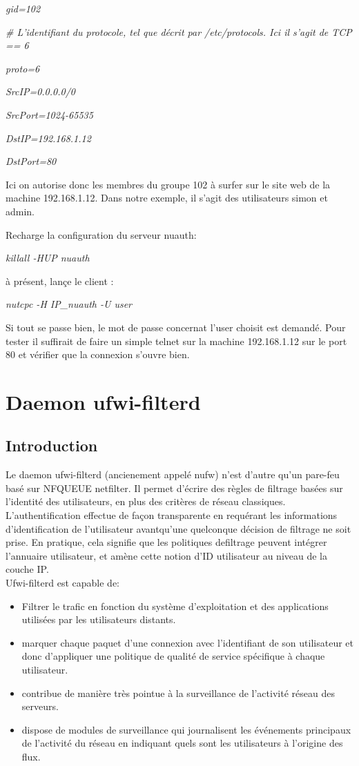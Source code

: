 \documentclass[12pt]{report}
\begin{document}
\begin{itemize}
\textit{gid=102}

\textit{# L’identifiant du protocole, tel que décrit par /etc/protocols. Ici il s’agit de TCP == 6}

\textit{proto=6}

\textit{SrcIP=0.0.0.0/0}

\textit{SrcPort=1024-65535}

\textit{DstIP=192.168.1.12}

\textit{DstPort=80}

Ici on autorise donc les membres du groupe 102 à surfer sur le site web de la machine 192.168.1.12. Dans notre exemple, 
il s’agit des utilisateurs simon et admin.

Recharge la configuration du serveur nuauth:

\textit{killall -HUP nuauth}

à présent, lançe le client :

\textit{nutcpc -H IP\_nuauth -U user}

Si tout se passe bien, le mot de passe concernat l'user choisit est demandé. Pour tester il suffirait de faire un simple
telnet sur la machine 192.168.1.12 sur le port 80 et vérifier que la connexion s'ouvre bien.


\chapter{Daemon ufwi-filterd}
\section{Introduction}

	Le daemon ufwi-filterd (ancienement appelé nufw) n'est d'autre qu'un pare-feu basé sur NFQUEUE netfilter. Il permet d'écrire des règles de filtrage basées sur l'identité des utilisateurs, en plus des critères de réseau classiques. L'authentification effectue de façon transparente en requérant les informations d’identification de l’utilisateur avantqu’une quelconque décision de filtrage ne soit prise. En pratique, cela signifie que les politiques defiltrage peuvent intégrer l’annuaire utilisateur, et amène cette notion d’ID utilisateur au niveau de la couche IP.\\
Ufwi-filterd est capable de:
\begin{itemize}
  \item Filtrer le trafic en fonction du système d’exploitation et des applications utilisées par les utilisateurs
     distants.
  \item marquer chaque paquet d'une connexion avec l'identifiant de son utilisateur et donc d'appliquer une politique de qualité de service spécifique à chaque utilisateur. 
  \item contribue de manière très pointue à la surveillance de l'activité réseau des serveurs.
  \item dispose de modules de surveillance qui journalisent les événements principaux de l'activité du réseau en indiquant quels sont les utilisateurs à l'origine des flux.
\end{itemize}

\end{itemize}
\end{document}
